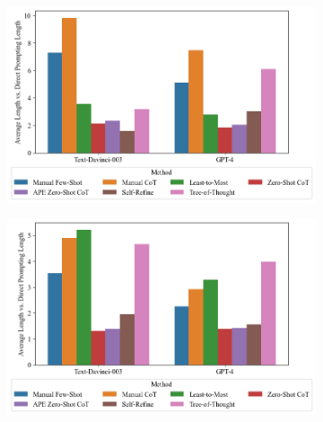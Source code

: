 \documentclass[11pt]{article}
\begin{document}
\begin{figure}[h]
  \caption{Average Length vs. Direct Prompting Length}
  \begin{subfigure}[h]{0.4925\textwidth}
      \centering
      \includegraphics[width=0.95\hsize]{../Output/gsm8k_length_vs_direct_prompting_means.png} 
  \end{subfigure}
  \begin{subfigure}[h]{0.4925\textwidth}
      \centering
      \includegraphics[width=0.95\hsize]{../Output/cw_length_vs_direct_prompting_means.png}
  \end{subfigure}
  \hfill
\end{figure}
\end{document}
